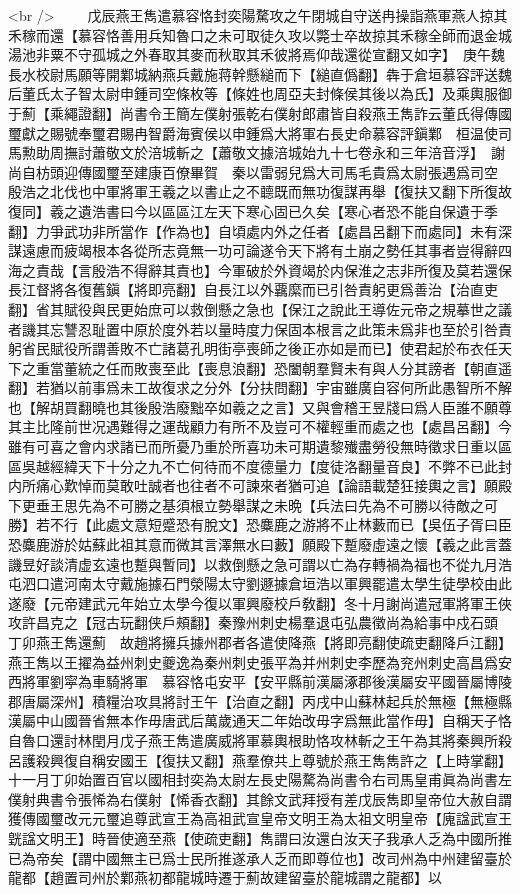 <br />
　　戊辰燕王雋遣慕容恪封奕陽騖攻之午閉城自守送冉操詣燕軍燕人掠其禾稼而還【慕容恪善用兵知魯口之未可取徒久攻以斃士卒故掠其禾稼全師而退金城湯池非粟不守孤城之外春取其麥而秋取其禾彼將焉仰哉還從宣翻又如字】　庚午魏長水校尉馬願等開鄴城納燕兵戴施蒋幹懸縋而下【縋直僞翻】犇于倉垣慕容評送魏后董氏太子智太尉申鍾司空條枚等【條姓也周亞夫封條侯其後以為氏】及乘輿服御于薊【乘繩證翻】尚書令王簡左僕射張乾右僕射郎肅皆自殺燕王雋詐云董氏得傳國璽獻之賜號奉璽君賜冉智爵海賓侯以申鍾爲大將軍右長史命慕容評鎭鄴　桓温使司馬勲助周撫討蕭敬文於涪城斬之【蕭敬文據涪城始九十七卷永和三年涪音浮】　謝尚自枋頭迎傳國璽至建康百僚畢賀　秦以雷弱兒爲大司馬毛貴爲太尉張遇爲司空　殷浩之北伐也中軍將軍王羲之以書止之不聼既而無功復謀再舉【復扶又翻下所復故復同】羲之遺浩書曰今以區區江左天下寒心固已久矣【寒心者恐不能自保遺于季翻】力爭武功非所當作【作為也】自頃處内外之任者【處昌呂翻下而處同】未有深謀遠慮而疲竭根本各從所志竟無一功可論遂令天下將有土崩之勢任其事者豈得辭四海之責哉【言殷浩不得辭其責也】今軍破於外資竭於内保淮之志非所復及莫若還保長江督將各復舊鎭【將即亮翻】自長江以外覊縻而已引咎責躬更爲善治【治直吏翻】省其賦役與民更始庶可以救倒懸之急也【保江之說此王導佐元帝之規摹世之議者譏其忘讐忍耻置中原於度外若以量時度力保固本根言之此策未爲非也至於引咎責躬省民賦役所謂善敗不亡諸葛孔明街亭喪師之後正亦如是而已】使君起於布衣任天下之重當董統之任而敗喪至此【喪息浪翻】恐闔朝羣賢未有與人分其謗者【朝直遥翻】若猶以前事爲未工故復求之分外【分扶問翻】宇宙雖廣自容何所此愚智所不解也【解胡買翻曉也其後殷浩廢黜卒如羲之之言】又與會稽王昱牋曰爲人臣誰不願尊其主比隆前世况遇難得之運哉顧力有所不及豈可不權輕重而處之也【處昌呂翻】今雖有可喜之會内求諸已而所憂乃重於所喜功未可期遺黎殱盡勞役無時徵求日重以區區吳越經緯天下十分之九不亡何待而不度德量力【度徒洛翻量音良】不弊不已此封内所痛心歎悼而莫敢吐誠者也往者不可諫來者猶可追【論語載楚狂接輿之言】願殿下更垂王思先為不可勝之基須根立勢舉謀之未晩【兵法曰先為不可勝以待敵之可勝】若不行【此處文意短蹙恐有脫文】恐麋鹿之游將不止林藪而已【吳伍子胥曰臣恐麋鹿游於姑蘇此祖其意而微其言澤無水曰藪】願殿下蹔廢虛遠之懷【羲之此言蓋譏昱好談清虚玄遠也蹔與暫同】以救倒懸之急可謂以亡為存轉禍為福也不從九月浩屯泗口遣河南太守戴施據石門滎陽太守劉遯據倉垣浩以軍興罷遣太學生徒學校由此遂廢【元帝建武元年始立太學今復以軍興廢校戶敎翻】冬十月謝尚遣冠軍將軍王俠攻許昌克之【冠古玩翻侠戶頰翻】秦豫州刺史楊羣退屯弘農徵尚為給事中戍石頭　丁卯燕王雋還薊　故趙將擁兵據州郡者各遣使降燕【將即亮翻使疏吏翻降戶江翻】燕王雋以王擢為益州刺史夔逸為秦州刺史張平為并州刺史李歷為兖州刺史高昌爲安西將軍劉寜為車騎將軍　慕容恪屯安平【安平縣前漢屬涿郡後漢屬安平國晉屬博陵郡唐屬深州】積糧治攻具將討王午【治直之翻】丙戌中山蘇林起兵於無極【無極縣漢屬中山國晉省無本作毋唐武后萬歲通天二年始改毋字爲無此當作毋】自稱天子恪自魯口還討林閏月戊子燕王雋遣廣威將軍慕輿根助恪攻林斬之王午為其將秦興所殺呂護殺興復自稱安國王【復扶又翻】燕羣僚共上尊號於燕王雋雋許之【上時掌翻】十一月丁卯始置百官以國相封奕為太尉左長史陽騖為尚書令右司馬皇甫眞為尚書左僕射典書令張悕為右僕射【悕香衣翻】其餘文武拜授有差戊辰雋即皇帝位大赦自謂獲傳國璽改元元璽追尊武宣王為高祖武宣皇帝文明王為太祖文明皇帝【廆諡武宣王皝諡文明王】時晉使適至燕【使疏吏翻】雋謂曰汝還白汝天子我承人乏為中國所推已為帝矣【謂中國無主已爲士民所推遂承人乏而即尊位也】改司州為中州建留臺於龍都【趙置司州於鄴燕初都龍城時遷于薊故建留臺於龍城謂之龍都】以